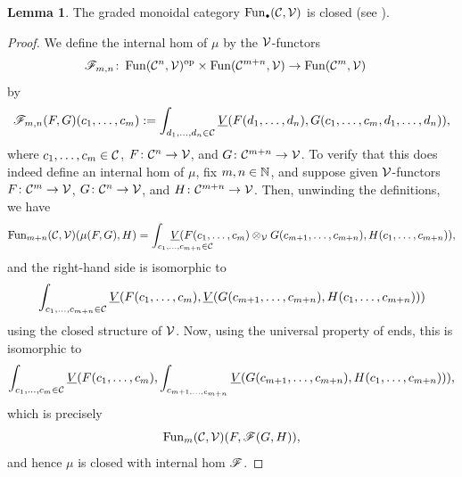 \documentclass[openany, amssymb, psamsfonts]{amsart}
\theoremstyle{definition}
\newtheorem{lem}{Lemma}[section]
\numberwithin{equation}{section}
\begin{document}
\begin{lem} \label{lem:Day_closed}
The graded monoidal category $\Fun_\sbull(\C, \V)$ is closed (see ).
\end{lem}
\begin{proof}
We define the internal hom of $\mu$ by the $\mathcal{V}$-functors
\begin{align*}
    \mathscr{F}_{m, n} &\colon \operatorname{Fun}(\mathcal{C}^n, \mathcal{V})^{\mathrm{op}} \times \operatorname{Fun}(\mathcal{C}^{m + n}, \mathcal{V}) \to \operatorname{Fun}(\mathcal{C}^m, \mathcal{V})
\end{align*} by
\begin{equation*}
    \mathscr{F}_{m, n}(F, G)(c_1, \dots, c_m) := \int_{d_1, \dots, d_n \in \mathcal{C}} \underline{V}(F(d_1, \dots, d_n), G(c_1, \dots, c_m, d_1, \dots, d_n)),
\end{equation*} where $c_1, \dots, c_m \in \mathcal{C}$, $F \colon \mathcal{C}^n \to \mathcal{V}$, and $G \colon \mathcal{C}^{m + n} \to \mathcal{V}$. To verify that this does indeed define an internal hom of $\mu$, fix $m, n \in \mathbb{N}$, and suppose given $\mathcal{V}$-functors $F \colon \mathcal{C}^m \to \mathcal{V}$, $G \colon \mathcal{C}^n \to \mathcal{V}$, and $H \colon \mathcal{C}^{m + n} \to \mathcal{V}$. Then, unwinding the definitions, we have
\begin{equation*}
    \Fun_{m + n}(\C, \V)(\mu(F, G), H) = \int_{c_1, \dots, c_{m + n} \in \C} \hspace{-4em}\underline{V}(F(c_1, \dots, c_m) \otimes_\V G(c_{m+1}, \dots, c_{m+n}), H(c_1, \dots, c_{m+n})),
\end{equation*} and the right-hand side is isomorphic to
\begin{equation*}
    \int_{c_1, \dots, c_{m + n} \in \mathcal{C}} \underline{V}(F(c_1, \dots, c_m), \underline{V}(G(c_{m + 1}, \dots, c_{m + n}), H(c_1, \dots, c_{m + n})))
\end{equation*} using the closed structure of $\mathcal{V}$. Now, using the universal property of ends, this is isomorphic to
\begin{equation*}
    \int_{c_1, \dots, c_m \in \mathcal{C}} \underline{V}(F(c_1, \dots, c_m), \int_{c_{m + 1, \dots, c_{m + n}}} \underline{V}(G(c_{m+1}, \dots, c_{m+n}), H(c_1, \dots, c_{m+n}))),
\end{equation*} which is precisely
\begin{equation*}
    \operatorname{Fun}_m(\mathcal{C}, \mathcal{V})(F, \mathscr{F}(G, H)),
\end{equation*} and hence $\mu$ is closed with internal hom $\mathscr{F}$.
\end{proof}
\end{document}
